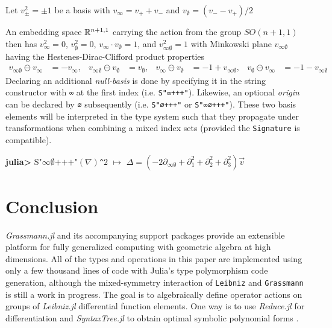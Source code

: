 \documentclass[]{article}
\begin{document}
\begin{definition}
	Let $v_\pm^2 = \pm1$ be a basis with $v_\infty = v_++v_-$ and $v_\emptyset = (v_--v_+)/2$
\end{definition}
An embedding space $\mathbb{R}^{n+1,1}$ carrying the action from the group $SO(n+1,1)$ then has
$v_\infty^2 =0$, $v_\emptyset^2 =0$,
$v_\infty \cdot v_\emptyset = 1$,  and $v_{\infty\emptyset}^2 = 1$ with
Minkowski plane $v_{\infty\emptyset}$ having the Hestenes-Dirac-Clifford product properties
\begin{align*}
	v_{\infty\emptyset}\ominus v_\infty &= -v_\infty, &  v_{\infty\emptyset}\ominus v_\emptyset &= v_\emptyset, &
	v_\infty\ominus v_\emptyset &= -1 + v_{\infty\emptyset}, & v_\emptyset\ominus v_\infty &=  -1 - v_{\infty\emptyset}
\end{align*}
Declaring an additional \textit{null-basis} is done by specifying it in the string constructor with \verb`∞` at the first index (i.e. \verb`S"∞+++"`). Likewise, an optional \textit{origin} can be declared by \verb`∅` subsequently (i.e. \verb`S"∅+++"` or \verb`S"∞∅+++"`). These two basis elements will be interpreted in the type system such that they propagate under transformations when combining a mixed index sets (provided the \verb`Signature` is compatible).
\begin{example}
	\textbf{julia>} S"$\infty\emptyset\text{+++"}(\nabla)$\verb`^`$2 \,\,  \mapsto\, \, \Delta = (-2\partial_{\infty\emptyset} + \partial_1^2 + \partial_2^2 + \partial_3^2)\vec v $
\end{example}

\section{Conclusion}

\textit{Grassmann.jl} and its accompanying support packages provide an extensible platform for fully generalized computing with geometric algebra at high dimensions.
All of the types and operations in this paper are implemented using only a few thousand lines of code with Julia's type polymorphism code generation, although the mixed-symmetry interaction of \verb`Leibniz` and \verb`Grassmann` is still a work in progress.
The goal is to algebraically define operator actions on groups of \textit{Leibniz.jl} differential function elements. 
One way is to use \textit{Reduce.jl} for differentiation and \textit{SyntaxTree.jl} to obtain optimal symbolic polynomial forms \cite{optim-poly}.
\end{document}
